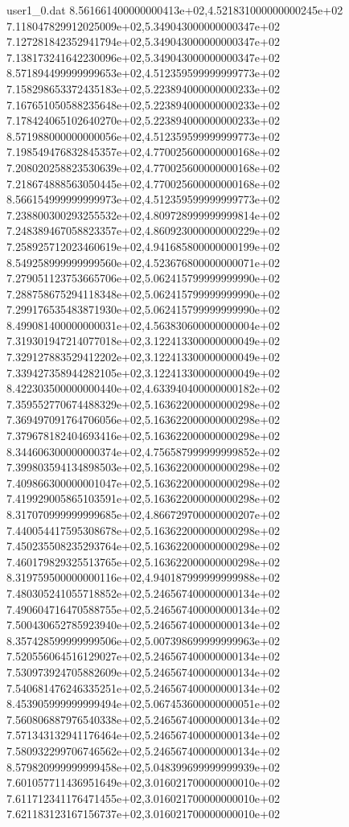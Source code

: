 \begin{filecontents}{user1_0.dat}
8.561661400000000413e+02,4.521831000000000245e+02
7.118047829912025009e+02,5.349043000000000347e+02
7.127281842352941794e+02,5.349043000000000347e+02
7.138173241642230096e+02,5.349043000000000347e+02
8.571894499999999653e+02,4.512359599999999773e+02
7.158298653372435183e+02,5.223894000000000233e+02
7.167651050588235648e+02,5.223894000000000233e+02
7.178424065102640270e+02,5.223894000000000233e+02
8.571988000000000056e+02,4.512359599999999773e+02
7.198549476832845357e+02,4.770025600000000168e+02
7.208020258823530639e+02,4.770025600000000168e+02
7.218674888563050445e+02,4.770025600000000168e+02
8.566154999999999973e+02,4.512359599999999773e+02
7.238800300293255532e+02,4.809728999999999814e+02
7.248389467058823357e+02,4.860923000000000229e+02
7.258925712023460619e+02,4.941685800000000199e+02
8.549258999999999560e+02,4.523676800000000071e+02
7.279051123753665706e+02,5.062415799999999990e+02
7.288758675294118348e+02,5.062415799999999990e+02
7.299176535483871930e+02,5.062415799999999990e+02
8.499081400000000031e+02,4.563830600000000004e+02
7.319301947214077018e+02,3.122413300000000049e+02
7.329127883529412202e+02,3.122413300000000049e+02
7.339427358944282105e+02,3.122413300000000049e+02
8.422303500000000440e+02,4.633940400000000182e+02
7.359552770674488329e+02,5.163622000000000298e+02
7.369497091764706056e+02,5.163622000000000298e+02
7.379678182404693416e+02,5.163622000000000298e+02
8.344606300000000374e+02,4.756587999999999852e+02
7.399803594134898503e+02,5.163622000000000298e+02
7.409866300000001047e+02,5.163622000000000298e+02
7.419929005865103591e+02,5.163622000000000298e+02
8.317070999999999685e+02,4.866729700000000207e+02
7.440054417595308678e+02,5.163622000000000298e+02
7.450235508235293764e+02,5.163622000000000298e+02
7.460179829325513765e+02,5.163622000000000298e+02
8.319759500000000116e+02,4.940187999999999988e+02
7.480305241055718852e+02,5.246567400000000134e+02
7.490604716470588755e+02,5.246567400000000134e+02
7.500430652785923940e+02,5.246567400000000134e+02
8.357428599999999506e+02,5.007398699999999963e+02
7.520556064516129027e+02,5.246567400000000134e+02
7.530973924705882609e+02,5.246567400000000134e+02
7.540681476246335251e+02,5.246567400000000134e+02
8.453905999999999494e+02,5.067453600000000051e+02
7.560806887976540338e+02,5.246567400000000134e+02
7.571343132941176464e+02,5.246567400000000134e+02
7.580932299706746562e+02,5.246567400000000134e+02
8.579820999999999458e+02,5.048399699999999939e+02
7.601057711436951649e+02,3.016021700000000010e+02
7.611712341176471455e+02,3.016021700000000010e+02
7.621183123167156737e+02,3.016021700000000010e+02

\end{filecontents}
